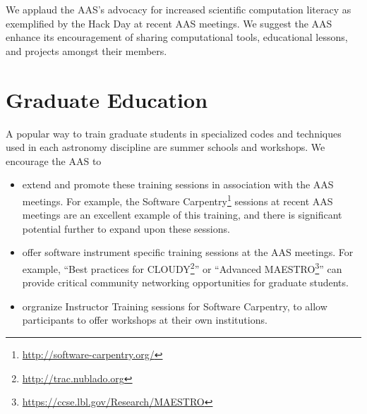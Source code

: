 \documentclass[11pt]{article}
\newenvironment{squishlist}                                                     
  {\begin{itemize}                                                              
    \addtolength{\itemsep}{-0.33\baselineskip}                                  
   }                                                                            
  { \end{itemize} }
\begin{document}
We applaud the AAS's advocacy for increased scientific computation
literacy as exemplified by the Hack Day at recent AAS meetings.  We
suggest the AAS enhance its encouragement of sharing computational
tools, educational lessons, and projects amongst their members.


%





\section{Graduate Education}

A popular way to train graduate students in specialized codes and
techniques used in each astronomy discipline are summer schools
and workshops. We encourage the AAS to 

\begin{squishlist}

\item extend and promote these training sessions
in association with the AAS meetings.  
For example, the Software Carpentry\footnote{\url{http://software-carpentry.org/}} 
sessions at recent AAS meetings are an excellent example of this training, 
and there is significant potential further to expand upon these sessions.  

\item offer software instrument specific training sessions
at the AAS meetings. For example, ``Best practices for CLOUDY\footnote{\url{http://trac.nublado.org}}''
or ``Advanced MAESTRO\footnote{\url{ https://ccse.lbl.gov/Research/MAESTRO}}'' can
provide critical community networking opportunities for graduate students.

\item orgranize Instructor Training sessions for Software Carpentry,
to allow participants to offer workshops at their own institutions.

\end{squishlist}
\end{document}
